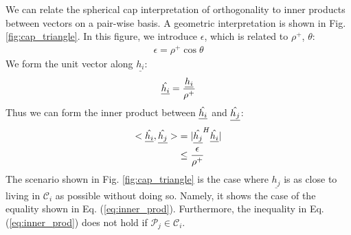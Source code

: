We can relate the spherical cap interpretation of orthogonality to inner products between vectors on a pair-wise basis. A geometric interpretation is shown in Fig. \ref{fig:cap_triangle}. In this figure, we introduce $\epsilon$, which is related to $\rho^+$, $\theta$:
\begin{equation}\label{eq:epsilon}
    \begin{aligned}
    \epsilon = \rho^+\cos{\theta}
    \end{aligned}
\end{equation}
We form the unit vector along $\underline{h_i}$:
\begin{equation}\label{eq:unit_vec}
    \begin{aligned}
    \Hat{\underline{h_i}} = \frac{\underline{h_i}}{\rho^+}
    \end{aligned}
\end{equation}
Thus we can form the inner product between $\Hat{\underline{h_i}}$ and $\Hat{\underline{h_j}}$:
\begin{equation}\label{eq:inner_prod}
    \begin{aligned}
    <\Hat{\underline{h_i}},\Hat{\underline{h_j}}> &= \vert \Hat{\underline{h_j}}^H\Hat{\underline{h_i}} \vert\\
    &\leq \frac{\epsilon}{\rho^+}
    \end{aligned}
\end{equation}
The scenario shown in Fig. \ref{fig:cap_triangle} is the case where $\underline{h_j}$ is as close to living in $\mathcal{C}_i$ as possible without doing so. Namely, it shows the case of the equality shown in Eq. (\ref{eq:inner_prod}). Furthermore, the inequality in Eq. (\ref{eq:inner_prod}) does not hold if $\mathcal{P}_j\in \mathcal{C}_i$.
